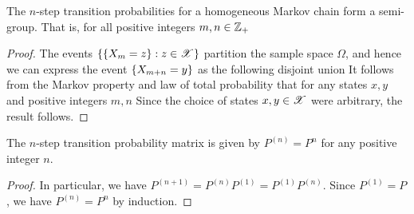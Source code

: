 \documentclass[letterpaper,10pt,english]{article}
\begin{document}
\begin{thm} 
The $n$-step transition probabilities for a homogeneous Markov chain form a semi-group. 
That is, for all positive integers $m,n \in \mathbb{Z}_+$
\end{thm}
\begin{proof} 
The events $\left\{ \left\{X_m = z\right\}: z \in \mathscr{X}\right\}$ partition the sample space $\Omega$, and hence we can express the event $\left\{X_{m+n} = y\right\}$ as the following disjoint union
It follows from the Markov property and law of total probability that for any states $x, y$ and positive integers $m, n$
Since the choice of  states $x,y \in \mathscr{X}$ were arbitrary, the result follows. 
\end{proof}
\begin{cor} 
The $n$-step transition probability matrix is given by $P^{(n)} = P^n$ for any positive integer $n$.
\end{cor}
\begin{proof}
In particular, we have $P^{(n+1)} = P^{(n)}P^{(1)} =  P^{(1)}P^{(n)}$. 
Since $P^{(1)} = P$, we have $P^{(n)} = P^n$ by induction. 
\end{proof} 
\end{document}
